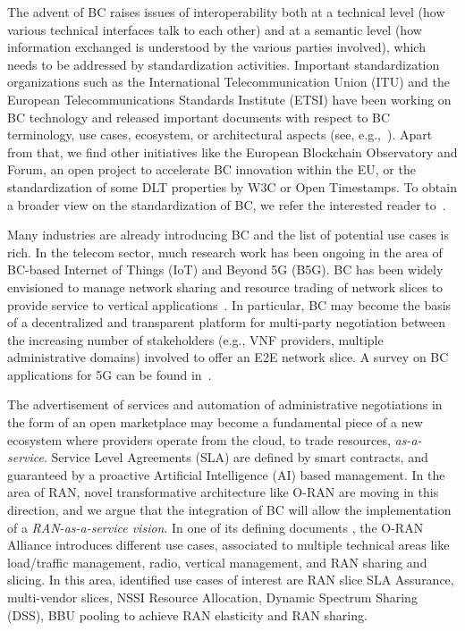 \documentclass[journal]{IEEEtran}
\begin{document}
The advent of BC raises issues of interoperability both at a technical level (how various technical interfaces talk to each other) and at a semantic level (how information exchanged is understood by the various parties involved), which needs to be addressed by standardization activities. Important standardization organizations such as the International Telecommunication Union (ITU) and the European Telecommunications Standards Institute (ETSI) have been working on BC technology and released important documents with respect to BC terminology, use cases, ecosystem, or architectural aspects (see, e.g.,~\cite{ITU1400,etsi2020permissioned}). Apart from that, we find other initiatives like the European Blockchain Observatory and Forum, an open project to accelerate BC innovation within the EU, or the standardization of some DLT properties by W3C or Open Timestamps. To obtain a broader view on the standardization of BC, we refer the interested reader to~\cite{konig2020comparing}.


Many industries are already introducing BC and the list of potential use cases is rich. In the telecom sector, much research work has been ongoing in the area of BC-based Internet of Things (IoT) and Beyond 5G (B5G). BC has been widely envisioned to manage network sharing and resource trading of network slices to provide service to vertical applications~\cite{xu2020blockchain}. In particular, BC may become the basis of a decentralized and transparent platform for multi-party negotiation between the increasing number of stakeholders (e.g., VNF providers, multiple administrative domains) involved to offer an E2E network slice. A survey on BC applications for 5G can be found in~\cite{nguyen2020blockchain}.

The advertisement of services and automation of administrative negotiations in the form of an open marketplace may become a fundamental piece of a new ecosystem where providers operate from the cloud, to trade resources, \textit{as-a-service}. Service Level Agreements (SLA) are defined by smart contracts, and guaranteed by a proactive Artificial Intelligence (AI) based management. In the area of RAN, novel transformative architecture like O-RAN are moving in this direction, and we argue that the integration of BC will allow the implementation of a \textit{RAN-as-a-service vision}. In one of its defining documents \cite{ORAN}, the {O-RAN} Alliance introduces different use cases, associated to multiple technical areas like load/traffic management, radio, vertical management, and RAN sharing and slicing. In this area, identified use cases of interest are RAN slice SLA Assurance, multi-vendor slices, NSSI Resource Allocation, Dynamic Spectrum Sharing (DSS), BBU pooling to achieve RAN elasticity and RAN sharing. 
\end{document}
